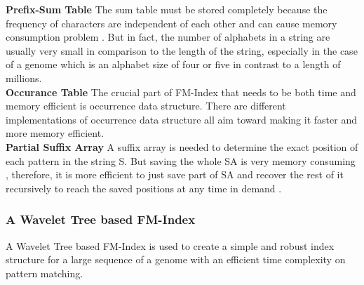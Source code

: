 \documentclass[11pt,a4paper]{report}
\begin{document}
\textbf{Prefix-Sum Table}  The sum table must be stored completely because the frequency of characters
are independent of each other and can cause memory consumption problem \cite{Wavthesis}.
But in  fact, the number of alphabets in a string are usually very small in comparison to
the length of the string, especially in the case of a genome which is an alphabet size of 
four or five in contrast to a length of millions.
\\

\textbf{Occurance Table} The crucial part of FM-Index that needs to be 
both time and memory efficient is occurrence data structure\cite{Wavthesis}.
There are different implementations of occurrence data structure all aim 
toward making it faster and more memory efficient.
\\

\textbf{Partial Suffix Array} A suffix array is needed to determine the 
exact position of each pattern in the string S.
But saving the whole SA is very memory consuming , therefore,
it is more efficient to just save part of SA and recover the rest
of it recursively to reach the saved positions at any time in demand
\cite{Wavthesis}.\\




\subsubsection{A Wavelet Tree based FM-Index}
\label{A Wavelet Tree based FM-Index}

A Wavelet Tree based FM-Index is used to create a simple and robust 
index structure for a large sequence of a genome with an efficient
time complexity on pattern matching.\\
\end{document}
